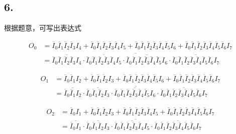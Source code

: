 \documentclass[12pt, a4paper]{ctexart}
\begin{document}
\subsection*{6.}

根据题意，可写出表达式

\begin{equation}
    \begin{aligned}
        O_0&=\overline I_0\overline I_1\overline I_2\overline I_3I_4
            +\overline I_0\overline I_1\overline I_2\overline I_3\overline I_4I_5
            +\overline I_0\overline I_1\overline I_2\overline I_3\overline I_4\overline I_5I_6
            +\overline I_0\overline I_1\overline I_2\overline I_3\overline I_4\overline I_5\overline I_6I_7
        \\ &=\overline{
            \overline{\overline I_0\overline I_1\overline I_2\overline I_3I_4}\cdot
            \overline{\overline I_0\overline I_1\overline I_2\overline I_3\overline I_4I_5}\cdot
            \overline{\overline I_0\overline I_1\overline I_2\overline I_3\overline I_4\overline I_5I_6}\cdot
            \overline{\overline I_0\overline I_1\overline I_2\overline I_3\overline I_4\overline I_5\overline I_6I_7}
        }
    \end{aligned}
\end{equation}

\begin{equation}
    \begin{aligned}
        O_1&=\overline I_0\overline I_1I_2
            +\overline I_0\overline I_1\overline I_2I_3
            +\overline I_0\overline I_1\overline I_2\overline I_3\overline I_4\overline I_5I_6
            +\overline I_0\overline I_1\overline I_2\overline I_3\overline I_4\overline I_5\overline I_6I_7
        \\ &=\overline{
            \overline{\overline I_0\overline I_1I_2}\cdot
            \overline{\overline I_0\overline I_1\overline I_2I_3}\cdot
            \overline{\overline I_0\overline I_1\overline I_2\overline I_3\overline I_4\overline I_5I_6}\cdot
            \overline{\overline I_0\overline I_1\overline I_2\overline I_3\overline I_4\overline I_5\overline I_6I_7}
        }
    \end{aligned}
\end{equation}

\begin{equation}
    \begin{aligned}
        O_2&=\overline I_0I_1
            +\overline I_0\overline I_1\overline I_2I_3
            +\overline I_0\overline I_1\overline I_2\overline I_3\overline I_4I_5
            +\overline I_0\overline I_1\overline I_2\overline I_3\overline I_4\overline I_5\overline I_6I_7
        \\ &=\overline{
            \overline{\overline I_0I_1}\cdot
            \overline{\overline I_0\overline I_1\overline I_2I_3}\cdot
            \overline{\overline I_0\overline I_1\overline I_2\overline I_3\overline I_4I_5}\cdot
            \overline{\overline I_0\overline I_1\overline I_2\overline I_3\overline I_4\overline I_5\overline I_6I_7}
        }
    \end{aligned}
\end{equation}
\end{document}
